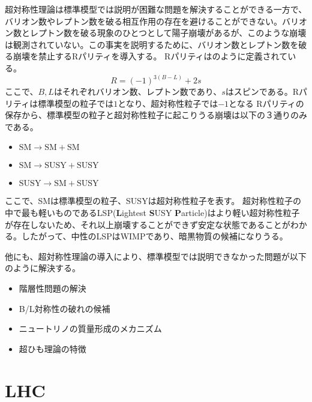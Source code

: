 超対称性理論は標準模型では説明が困難な問題を解決することができる一方で、バリオン数やレプトン数を破る相互作用の存在を避けることができない。バリオン数とレプトン数を破る現象のひとつとして陽子崩壊があるが、このような崩壊は観測されていない。この事実を説明するために、バリオン数とレプトン数を破る崩壊を禁止するRパリティを導入する。
Rパリティはのように定義されている。
\begin{equation}
  \label{eq:r}
  R = (-1)^{3(B-L)}+2s
\end{equation}
ここで、$B, L$はそれぞれバリオン数、レプトン数であり、$s$はスピンである。Rパリティは標準模型の粒子では$1$となり、超対称性粒子では$-1$となる
Rパリティの保存から、標準模型の粒子と超対称性粒子に起こりうる崩壊は以下の３通りのみである。
\begin{itemize}
  \item $\mathrm{SM} \to \mathrm{SM} + \mathrm{SM}$
  \item $\mathrm{SM} \to \mathrm{SUSY} + \mathrm{SUSY}$
  \item $\mathrm{SUSY} \to \mathrm{SM} + \mathrm{SUSY}$
\end{itemize}
ここで、SMは標準模型の粒子、SUSYは超対称性粒子を表す。
超対称性粒子の中で最も軽いものであるLSP(\textbf{L}ightest \textbf{S}USY \textbf{P}article)はより軽い超対称性粒子が存在しないため、それ以上崩壊することができず安定な状態であることがわかる。したがって、中性のLSPはWIMPであり、暗黒物質の候補になりうる。



他にも、超対称性理論の導入により、標準模型では説明できなかった問題が以下のように解決する。
\begin{itemize}
  \item 階層性問題の解決
  \item B/L対称性の破れの候補
  \item ニュートリノの質量形成のメカニズム
  \item 超ひも理論の特徴
\end{itemize}


\section{LHC}
\label{sec:LHC}

